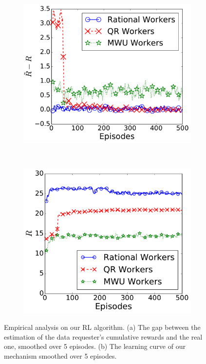 \begin{figure}[!t]
   \setlength{\abovecaptionskip}{0mm}
    \centering
    \begin{subfigure}[t]{0.24\textwidth}
        \centering
        \includegraphics[width=\textwidth]{image/RIL1}%
		\vspace{-1mm}
        \caption{\label{figure:rewardError}}
    \end{subfigure}%
~
    \begin{subfigure}[t]{0.23\textwidth}
        \centering
        \includegraphics[width=\textwidth]{image/RIL2}%
		\vspace{-1mm}
        \caption{\label{figure:learningCurve}}
    \end{subfigure}
    \vspace{-2mm}
    \caption{\label{figure:learning}Empirical analysis on our RL algorithm. (a) The gap between the estimation of the data requester's cumulative rewards and the real one, smoothed over 5 episodes. (b) The learning curve of our mechanism smoothed over 5 episodes.}
	\vspace{-3mm}
\end{figure}

